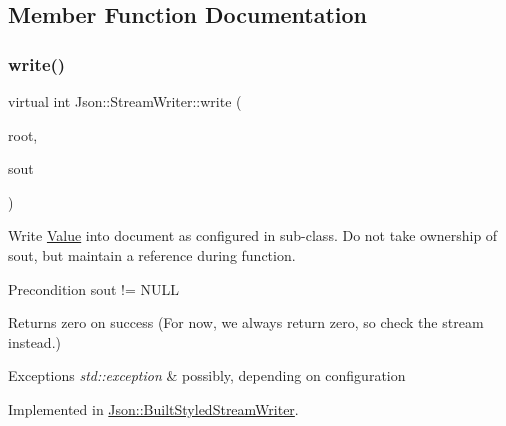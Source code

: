 \subsection{Member Function Documentation}
\hypertarget{class_json_1_1_stream_writer_a84278bad0c9a9fc587bc2a97c5bb5993}{}\label{class_json_1_1_stream_writer_a84278bad0c9a9fc587bc2a97c5bb5993} 
\subsubsection{\texorpdfstring{write()}{write()}\hspace{0.1cm}{\footnotesize\ttfamily [1/2]}}
{\footnotesize\ttfamily virtual int Json\+::\+Stream\+Writer\+::write (\begin{DoxyParamCaption}\item[{\hyperlink{class_json_1_1_value}{Value} const \&}]{root,  }\item[{\hyperlink{config_8h_a37a25be5fca174927780caeb280094ce}{J\+S\+O\+N\+C\+P\+P\+\_\+\+O\+S\+T\+R\+E\+AM} $\ast$}]{sout }\end{DoxyParamCaption})\hspace{0.3cm}{\ttfamily [pure virtual]}}

Write \hyperlink{class_json_1_1_value}{Value} into document as configured in sub-\/class. Do not take ownership of sout, but maintain a reference during function. \begin{DoxyPrecond}{Precondition}
sout != N\+U\+LL 
\end{DoxyPrecond}
\begin{DoxyReturn}{Returns}
zero on success (For now, we always return zero, so check the stream instead.) 
\end{DoxyReturn}

\begin{DoxyExceptions}{Exceptions}
{\em std\+::exception} & possibly, depending on configuration \\
\hline
\end{DoxyExceptions}


Implemented in \hyperlink{struct_json_1_1_built_styled_stream_writer_a823cdb1afabb6b0d5f39bcd5a6a6f747}{Json\+::\+Built\+Styled\+Stream\+Writer}.

\hypertarget{class_json_1_1_stream_writer_a84278bad0c9a9fc587bc2a97c5bb5993}{}\label{class_json_1_1_stream_writer_a84278bad0c9a9fc587bc2a97c5bb5993} 
